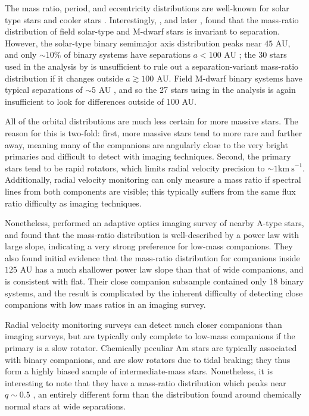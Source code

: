 \documentclass{emulateapj}
\begin{document}
The mass ratio, period, and eccentricity distributions are well-known for solar type stars \citep{Duquennoy1991, Raghavan2010} and cooler stars \citep{Fischer1992, Delfosse2004}. Interestingly, \citet{Reggiani2011}, and later \citet{Meyer2013}, found that the mass-ratio distribution of field solar-type and M-dwarf stars is invariant to separation. However, the solar-type binary semimajor axis distribution peaks near $45$ AU, and only $\sim 10\%$ of binary systems have separations $a < 100$ AU \citep{Raghavan2010}; the 30 stars used in the analysis by \citet{Reggiani2011} is unsufficient to rule out a separation-variant mass-ratio distribution if it changes outside $a \gtrsim 100$ AU. Field M-dwarf binary systems have typical separations of $\sim 5$ AU \citep{Fischer1992}, and so the 27 stars using in the analysis is again insufficient to look for differences outside of $100$ AU.

All of the orbital distributions are much less certain for more massive stars. The reason for this is two-fold: first, more massive stars tend to more rare and farther away, meaning many of the companions are angularly close to the very bright primaries and difficult to detect with imaging techniques. Second, the primary stars tend to be rapid rotators, which limits radial velocity precision to $\sim 1 \mathrm{km\ s}^{-1}$. Additionally, radial velocity monitoring can only measure a mass ratio if spectral lines from both components are visible; this typically suffers from the same flux ratio difficulty as imaging techniques. 

Nonetheless, \citet{DeRosa2014} performed an adaptive optics imaging survey of nearby A-type stars, and found that the mass-ratio distribution is well-described by a power law with large slope, indicating a very strong preference for low-mass companions. They also found initial evidence that the mass-ratio distribution for companions inside $125$ AU has a much shallower power law slope than that of wide companions, and is consistent with flat. Their close companion subsample contained only 18 binary systems, and the result is complicated by the inherent difficulty of detecting close companions with low mass ratios in an imaging survey. 

Radial velocity monitoring surveys can detect much closer companions than imaging surveys, but are typically only complete to low-mass companions if the primary is a slow rotator. Chemically peculiar Am stars are typically associated with binary companions, and are slow rotators due to tidal braking; they thus form a highly biased sample of intermediate-mass stars. Nonetheless, it is interesting to note that they have a mass-ratio distribution which peaks near $q \sim 0.5$ \citep{Vuissoz2004}, an entirely different form than the distribution found around chemically normal stars at wide separations.
\end{document}
